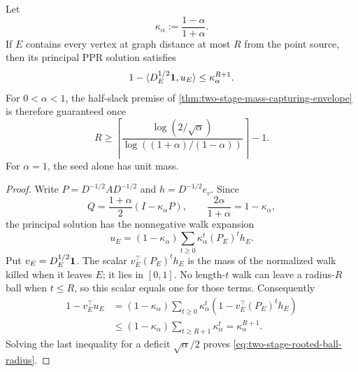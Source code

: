 \begin{theorem}
\label{thm:two-stage-rooted-ball-mass}
Let
\begin{equation*}
 \kappa_\alpha:=\frac{1-\alpha}{1+\alpha}.
\end{equation*}
If $E$ contains every vertex at graph distance at most $R$ from the point
source, then its principal PPR solution satisfies
\begin{equation}
 1-\langle D_E^{1/2}\mathbf{1},u_E\rangle
 \leq \kappa_\alpha^{R+1}.
 \label{eq:two-stage-rooted-ball-mass}
\end{equation}
For $0<\alpha<1$, the half-slack premise of
\cref{thm:two-stage-mass-capturing-envelope} is therefore guaranteed once
\begin{equation}
 R\geq
 \left\lceil
  \frac{\log(2/\sqrt\alpha)}
       {\log((1+\alpha)/(1-\alpha))}
 \right\rceil-1.
 \label{eq:two-stage-rooted-ball-radius}
\end{equation}
For $\alpha=1$, the seed alone has unit mass.
\end{theorem}

\begin{proof}
Write $P=D^{-1/2}AD^{-1/2}$ and
$h=D^{-1/2}e_v$.  Since
\begin{equation*}
 Q=\frac{1+\alpha}{2}(I-\kappa_\alpha P),
 \qquad
 \frac{2\alpha}{1+\alpha}=1-\kappa_\alpha,
\end{equation*}
the principal solution has the nonnegative walk expansion
\begin{equation*}
 u_E=(1-\kappa_\alpha)
 \sum_{t\geq0}\kappa_\alpha^t(P_E)^th_E.
\end{equation*}
Put $v_E=D_E^{1/2}\mathbf{1}$.  The scalar
$v_E^\top(P_E)^th_E$ is the mass of the normalized walk killed when it leaves
$E$; it lies in $[0,1]$.  No length-$t$ walk can leave a radius-$R$ ball when
$t\leq R$, so this scalar equals one for those terms.  Consequently
\begin{align*}
 1-v_E^\top u_E
 &=(1-\kappa_\alpha)
   \sum_{t\geq0}\kappa_\alpha^t
     \left(1-v_E^\top(P_E)^th_E\right)\\
 &\leq(1-\kappa_\alpha)
   \sum_{t\geq R+1}\kappa_\alpha^t
 =\kappa_\alpha^{R+1}.
\end{align*}
Solving the last inequality for a deficit $\sqrt\alpha/2$ proves
\cref{eq:two-stage-rooted-ball-radius}.
\end{proof}

